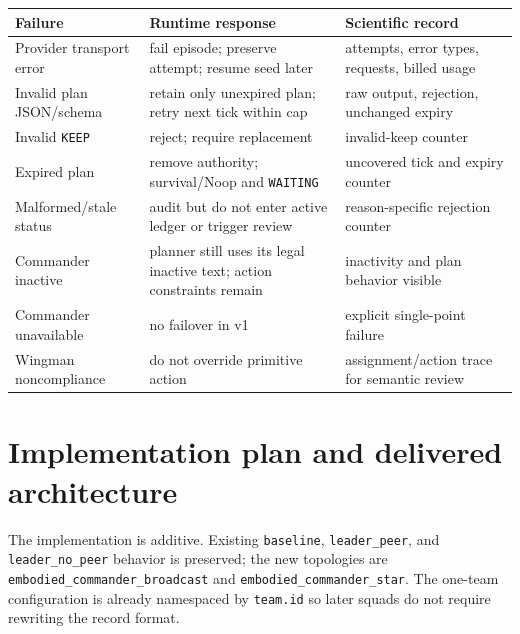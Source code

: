 \documentclass[11pt]{article}
\newcommand{\code}[1]{\texttt{#1}}
\begin{document}
\begin{longtable}{p{}p{}p{}}
\toprule
Failure & Runtime response & Scientific record\\
\midrule
Provider transport error & fail episode; preserve attempt; resume seed later & attempts, error types, requests, billed usage\\
Invalid plan JSON/schema & retain only unexpired plan; retry next tick within cap & raw output, rejection, unchanged expiry\\
Invalid \code{KEEP} & reject; require replacement & invalid-keep counter\\
Expired plan & remove authority; survival/Noop and \code{WAITING} & uncovered tick and expiry counter\\
Malformed/stale status & audit but do not enter active ledger or trigger review & reason-specific rejection counter\\
Commander inactive & planner still uses its legal inactive text; action constraints remain & inactivity and plan behavior visible\\
Commander unavailable & no failover in v1 & explicit single-point failure\\
Wingman noncompliance & do not override primitive action & assignment/action trace for semantic review\\
\bottomrule
\end{longtable}

\section{Implementation plan and delivered architecture}

The implementation is additive.  Existing \code{baseline}, \code{leader\_peer},
and \code{leader\_no\_peer} behavior is preserved; the new topologies are
\code{embodied\_commander\_broadcast} and
\code{embodied\_commander\_star}.  The one-team configuration is already
namespaced by \code{team.id} so later squads do not require rewriting the record
format.
\end{document}
